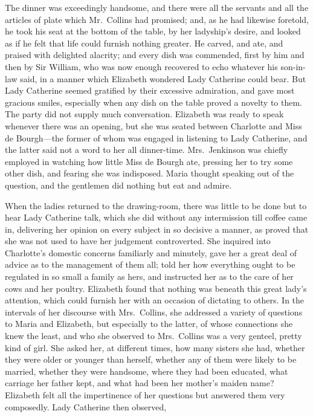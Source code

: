 \documentclass[12pt,english]{book}
\begin{document}
The dinner was exceedingly handsome, and there were all the servants
and all the articles of plate which Mr.\ Collins had promised; and,
as he had likewise foretold, he took his seat at the bottom of the
table, by her ladyship's desire, and looked as if he felt that life
could furnish nothing greater. He carved, and ate, and praised with
delighted alacrity; and every dish was commended, first by him and
then by Sir William, who was now enough recovered to echo whatever
his son-in-law said, in a manner which Elizabeth wondered Lady Catherine
could bear. But Lady Catherine seemed gratified by their excessive
admiration, and gave most gracious smiles, especially when any dish
on the table proved a novelty to them. The party did not supply much
conversation. Elizabeth was ready to speak whenever there was an opening,
but she was seated between Charlotte and Miss de Bourgh\mbox{---}the
former of whom was engaged in listening to Lady Catherine, and the
latter said not a word to her all dinner-time. Mrs.\ Jenkinson was
chiefly employed in watching how little Miss de Bourgh ate, pressing
her to try some other dish, and fearing she was indisposed. Maria
thought speaking out of the question, and the gentlemen did nothing
but eat and admire.

When the ladies returned to the drawing-room, there was little to
be done but to hear Lady Catherine talk, which she did without any
intermission till coffee came in, delivering her opinion on every
subject in so decisive a manner, as proved that she was not used to
have her judgement controverted. She inquired into Charlotte's domestic
concerns familiarly and minutely, gave her a great deal of advice
as to the management of them all; told her how everything ought to
be regulated in so small a family as hers, and instructed her as to
the care of her cows and her poultry. Elizabeth found that nothing
was beneath this great lady's attention, which could furnish her with
an occasion of dictating to others. In the intervals of her discourse
with Mrs.\ Collins, she addressed a variety of questions to Maria
and Elizabeth, but especially to the latter, of whose connections
she knew the least, and who she observed to Mrs.\ Collins was a very
genteel, pretty kind of girl. She asked her, at different times, how
many sisters she had, whether they were older or younger than herself,
whether any of them were likely to be married, whether they were handsome,
where they had been educated, what carriage her father kept, and what
had been her mother's maiden name? Elizabeth felt all the impertinence
of her questions but answered them very composedly. Lady Catherine
then observed,
\end{document}
